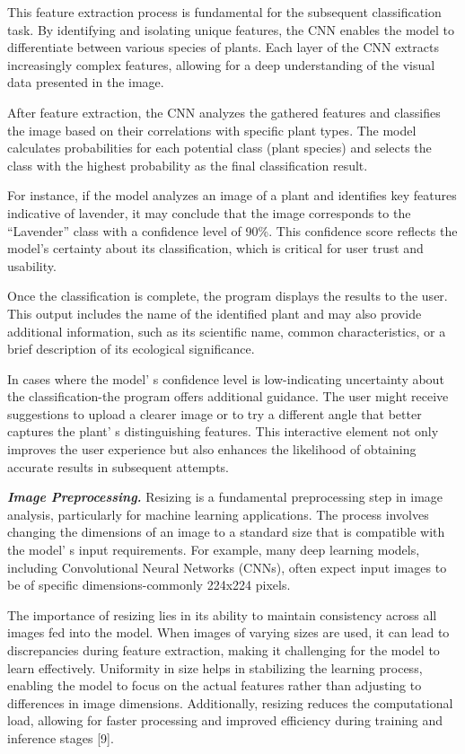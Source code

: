 \begin{multicols}{2}
This feature extraction process is fundamental for the subsequent
classification task. By identifying and isolating unique features, the
CNN enables the model to differentiate between various species of
plants. Each layer of the CNN extracts increasingly complex features,
allowing for a deep understanding of the visual data presented in the
image.

After feature extraction, the CNN analyzes the gathered features and
classifies the image based on their correlations with specific plant
types. The model calculates probabilities for each potential class
(plant species) and selects the class with the highest probability as
the final classification result.

For instance, if the model analyzes an image of a plant and identifies
key features indicative of lavender, it may conclude that the image
corresponds to the ``Lavender'' class with a confidence level of 90\%.
This confidence score reflects the model's certainty about its
classification, which is critical for user trust and usability.

Once the classification is complete, the program displays the results to
the user. This output includes the name of the identified plant and may
also provide additional information, such as its scientific name, common
characteristics, or a brief description of its ecological significance.

In cases where the model' s confidence level is
low-indicating uncertainty about the classification-the program offers
additional guidance. The user might receive suggestions to upload a
clearer image or to try a different angle that better captures the
plant' s distinguishing features. This interactive
element not only improves the user experience but also enhances the
likelihood of obtaining accurate results in subsequent attempts.

\emph{{\bfseries Image Preprocessing.}} Resizing is a fundamental
preprocessing step in image analysis, particularly for machine learning
applications. The process involves changing the dimensions of an image
to a standard size that is compatible with the model' s
input requirements. For example, many deep learning models, including
Convolutional Neural Networks (CNNs), often expect input images to be of
specific dimensions-commonly 224x224 pixels.

The importance of resizing lies in its ability to maintain consistency
across all images fed into the model. When images of varying sizes are
used, it can lead to discrepancies during feature extraction, making it
challenging for the model to learn effectively. Uniformity in size helps
in stabilizing the learning process, enabling the model to focus on the
actual features rather than adjusting to differences in image
dimensions. Additionally, resizing reduces the computational load,
allowing for faster processing and improved efficiency during training
and inference stages {[}9{]}.


\end{multicols}
